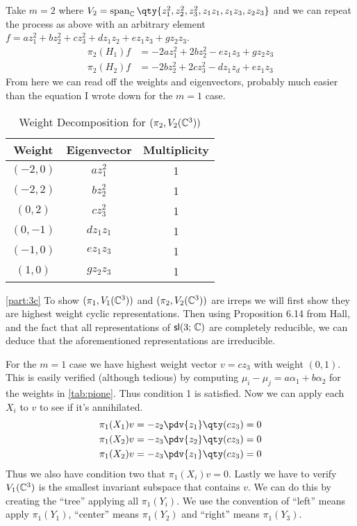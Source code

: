 \documentclass[
	pages,
	boxes,
	color=WildStrawberry
]{homework}
\begin{document}
\begin{solution}
	Take $m = 2$ where $V_2 = \vspan_\C\qty{z_1^2, z_2^2, z_3^2, z_1z_1, z_1z_3, z_2z_3}$ and we can repeat the process as above with an arbitrary element $f = az_1^2 + bz_2^2 + cz_3^2 + dz_1z_2 + ez_1z_3 + gz_2z_3$.
	\begin{align*}
		\pi_2(H_1)f & = -2az_1^2 + 2bz_2^2 - ez_1z_3 + gz_2z_3 \\
		\pi_2(H_2)f & = -2bz_2^2 + 2cz_3^2 - dz_1z_d + ez_1z_3
	\end{align*}
	From here we can read off the weights and eigenvectors, probably much easier than the equation I wrote down for the $m = 1$ case.
	\begin{table}[h]
		\centering\begin{tabular}{c c c}
			Weight    & Eigenvector & Multiplicity \\ \toprule
			$(-2, 0)$ & $az_1^2$    & 1            \\
			$(-2, 2)$ & $bz_2^2$    & 1            \\
			$(0, 2)$  & $cz_3^2$    & 1            \\
			$(0, -1)$ & $dz_1z_1$   & 1            \\
			$(-1, 0)$ & $ez_1z_3$   & 1            \\
			$(1, 0)$  & $gz_2z_3$   & 1
		\end{tabular}
		\caption{Weight Decomposition for $(\pi_2, V_2(\mathbb{C}^3))$}\label{tab:pitwo}
	\end{table}

	\ref{part:3c}
	To show $(\pi_1, V_1(\mathbb{C}^3))$ and $(\pi_2, V_2(\mathbb{C}^3))$ are irreps we will first show they are highest weight cyclic representations. Then using Proposition 6.14 from Hall, and the fact that all representations of $\mathsf{sl}(3;\, \mathbb{C})$ are completely reducible, we can deduce that the aforementioned representations are irreducible.

	For the $m = 1$ case we have highest weight vector $v = cz_3$ with weight $(0, 1)$. This is easily verified (although tedious) by computing $\mu_i - \mu_j = a\alpha_1 + b\alpha_2$ for the weights in \cref{tab:pione}. Thus condition 1 is satisfied. Now we can apply each $X_i$ to $v$ to see if it's annihilated.
	\begin{align*}
		\pi_1(X_1)v & = -z_2\pdv{z_1}\qty(cz_3) = 0 \\
		\pi_1(X_2)v & = -z_3\pdv{z_2}\qty(cz_3) = 0 \\
		\pi_1(X_2)v & = -z_3\pdv{z_1}\qty(cz_3) = 0
	\end{align*}
	Thus we also have condition two that $\pi_1(X_i)v = 0$. Lastly we have to verify $V_1(\mathbb{C}^3)$ is the smallest invariant subspace that contains $v$. We can do this by creating the ``tree'' applying all $\pi_1(Y_i)$. We use the convention of ``left'' means apply $\pi_1(Y_1)$, ``center'' means $\pi_1(Y_2)$ and ``right'' means $\pi_1(Y_3)$.


\end{solution}
\end{document}
